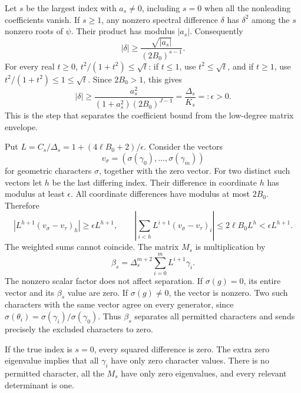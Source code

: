 \documentclass[11pt]{article}
\begin{document}
Let \(s\) be the largest index with \(a_s\ne0\), including \(s=0\)
when all the nonleading coefficients vanish. If \(s\ge1\), any
nonzero spectral difference \(\delta\) has \(\delta^2\) among
the \(s\) nonzero roots of \(\psi\). Their product has modulus
\(|a_s|\). Consequently
\[
       |\delta|\ge\frac{\sqrt{|a_s|}}{(2B_0)^{s-1}}.
\]
For every real \(t\ge0\),
\(t^2/(1+t^2)\le\sqrt t\): if \(t\le1\), use
\(t^2\le\sqrt t\), and if \(t\ge1\), use
\(t^2/(1+t^2)\le1\le\sqrt t\). Since \(2B_0>1\), this gives
\begin{equation}\label{epsilon}
  |\delta|\ge
  \frac{a_s^2}{(1+a_s^2)(2B_0)^{J-1}}
       =\frac{\Delta_s}{K_s}=:\epsilon>0.
\end{equation}
This is the step that separates the coefficient bound from the
low-degree matrix envelope.

Put \(L=C_s/\Delta_s=1+(4\ell B_0+2)/\epsilon\). Consider the vectors
\[
  v_\sigma=(\sigma(\gamma_0),\ldots,\sigma(\gamma_m))
\]
for geometric characters \(\sigma\), together with the zero vector.
For two distinct such vectors let \(h\) be the last differing index.
Their difference in coordinate \(h\) has modulus at least \(\epsilon\).
All coordinate differences have modulus at most \(2B_0\). Therefore
\[
 \left|L^{h+1}(v_\sigma-v_\tau)_h\right|
       \ge\epsilon L^{h+1},\qquad
 \left|\sum_{i<h}L^{i+1}(v_\sigma-v_\tau)_i\right|
       \le2\ell B_0L^h<\epsilon L^{h+1}.
\]
The weighted sums cannot coincide. The matrix \(M_s\) is multiplication by
\[
 \beta_s=\Delta_s^{m+2}\sum_{i=0}^m L^{i+1}\gamma_i.
\]
The nonzero scalar factor does not affect separation. If
\(\sigma(g)=0\), its entire vector and its \(\beta_s\) value are zero.
If \(\sigma(g)\ne0\), the vector is nonzero. Two such characters
with the same vector agree on every generator, since
\(\sigma(\theta_i)=\sigma(\gamma_i)/\sigma(\gamma_0)\).
Thus \(\beta_s\) separates all permitted characters and sends
precisely the excluded characters to zero.

If the true index is \(s=0\), every squared difference is zero.
The extra zero eigenvalue implies that all \(\gamma_i\) have only
zero character values. There is no permitted character, all the
\(M_s\) have only zero eigenvalues, and every relevant determinant
is one.
\end{document}
